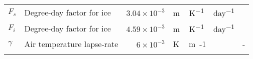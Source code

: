 \documentclass[tc, manuscript]{copernicus}
\begin{document}
\begin{table*}
{\begin{tabular}{llrll}
    $F_s$   & Degree-day factor for ice
            & $3.04\times10^{-3}$
            & \unit{m\,K^{-1}\,day^{-1}}
            & \citet{Shea.etal.2009} \\

    $F_i$   & Degree-day factor for ice
            & $4.59\times10^{-3}$
            & \unit{m\,K^{-1}\,day^{-1}}
            & \citet{Shea.etal.2009} \\

    $\gamma$& Air temperature lapse-rate
            & $6\times10^{-3}$
            & \unit{K\,m{-1}}
            & - \\

    \bottomhline
  \end{tabular}}
  \belowtable{}
\end{table*}

\end{document}
